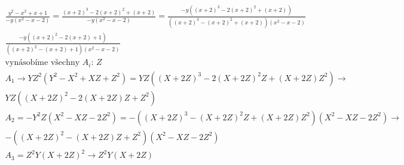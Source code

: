 \documentclass[12pt, a4paper]{article}
\begin{document}
\begin{gather*}
\frac{y^2-x^2+x+1}{-y(x^2-x-2)} = \frac{(x+2)^3-2(x+2)^2+(x+2)}{-y(x^2-x-2)} = \frac{-y((x+2)^3-2(x+2)^2+(x+2))}{((x+2)^3-(x+2)^2+(x+2))(x^2-x-2)}\\
\frac{-y((x+2)^2-2(x+2)+1)}{((x+2)^2-(x+2)+1)(x^2-x-2)}
\end{gather*}
\begin{gather*}
\text{vynásobíme všechny  $A_i$: $Z$}\\
A_1 \rightarrow YZ^2(Y^2-X^2+XZ+Z^2) = YZ((X+2Z)^3 - 2(X+2Z)^2Z+(X+2Z)Z^2) \rightarrow\\
YZ((X+2Z)^2 - 2(X+2Z)Z+Z^2)\\
A_2 = -Y^2Z(X^2-XZ-2Z^2) = -((X+2Z)^3 - (X+2Z)^2Z+(X+2Z)Z^2)(X^2-XZ-2Z^2) \rightarrow\\
-((X+2Z)^2 - (X+2Z)Z+Z^2)(X^2-XZ-2Z^2)\\
A_3 = Z^2Y(X+2Z)^2 \rightarrow Z^2Y(X+2Z)
\end{gather*}
\end{document}
